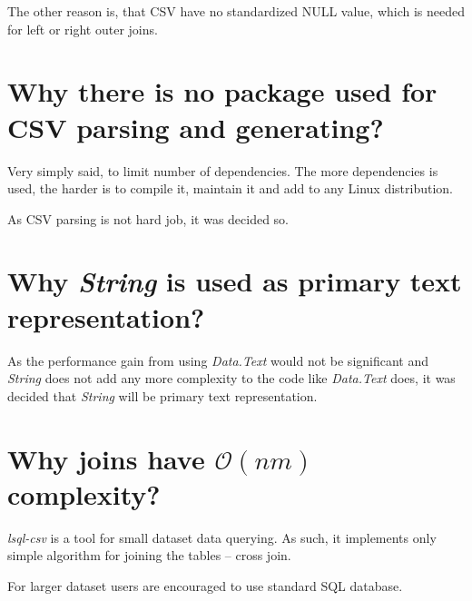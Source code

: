 The other reason is, that CSV have no standardized NULL value, which is needed for left or right outer joins.

\section{Why there is no package used for CSV parsing and generating?}
Very simply said, to limit number of dependencies. The more dependencies is used, the harder is to compile it, maintain it and add to any Linux distribution.

As CSV parsing is not hard job, it was decided so.

\section{Why \textit{String} is used as primary text representation?}
As the performance gain from using \textit{Data.Text} would not be significant and \textit{String} does not add any more complexity to the code like \textit{Data.Text} does, 
it was decided that \textit{String} will be primary text representation.

\section{Why joins have $\mathcal{O}(nm)$ complexity?}
\textit{lsql-csv} is a tool for small dataset data querying. As such, it implements only simple algorithm for joining the tables -- cross join.

For larger dataset users are encouraged to use standard SQL database.



